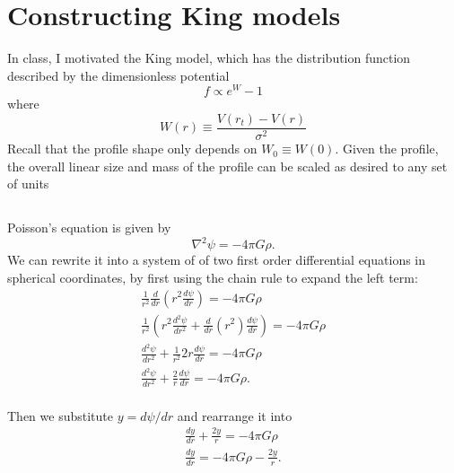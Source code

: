\section{Constructing King models}
In class, I motivated the King model, which has the distribution function described by the dimensionless potential
\begin{equation}
    f\propto e^W -1
\end{equation}
where 
\begin{equation}
    W(r)\equiv\frac{V(r_t)-V(r)}{\sigma^2}
\end{equation}
Recall that the profile shape only depends on $W_0 \equiv W(0)$. Given the
profile, the overall linear size and mass of the profile can be scaled as
desired to any set of units

\subsection{}

Poisson's equation is given by
\begin{equation}
    \nabla^2\psi=-4\pi G\rho.
\end{equation}
We can rewrite it into a system of of two first order differential equations in spherical coordinates, by first using the chain rule to expand the left term:
\begin{align*}
    \frac{1}{r^2}\frac{d}{dr}\left(r^2\frac{d\psi}{dr}\right)=-4\pi G \rho\\
    \frac{1}{r^2}\left(r^2\frac{d^2\psi}{dr^2}+\frac{d}{dr}(r^2)\frac{d\psi}{dr}\right)=-4\pi G\rho\\
    \frac{d^2\psi}{dr^2}+\frac{1}{r^2}2r\frac{d\psi}{dr}=-4\pi G\rho\\
    \frac{d^2\psi}{dr^2}+\frac{2}{r}\frac{d\psi}{dr}=-4\pi G\rho.\\
\end{align*}

Then we substitute $y=d\psi/dr$ and rearrange it into
\begin{align*}
    \frac{dy}{dr}+\frac{2y}{r}=-4\pi G\rho\\
    \frac{dy}{dr}=-4\pi G\rho-\frac{2y}{r}.
\end{align*}


